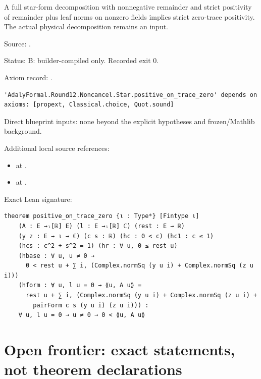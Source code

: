 \begin{theorem}[bp-340]
\label{bp-340}
\uses{}
\leanok
A full star-form decomposition with nonnegative remainder and strict positivity of remainder plus leaf norms on nonzero fields implies strict zero-trace positivity. The actual physical decomposition remains an input.

\par Source: \texttt{}.
\par Status: B: builder-compiled only. Recorded exit 0.
\par Axiom record: \texttt{}.
\begin{verbatim}
'AdalyFormal.Round12.Noncancel.Star.positive_on_trace_zero' depends on axioms: [propext, Classical.choice, Quot.sound]
\end{verbatim}
\par Direct blueprint inputs: none beyond the explicit hypotheses and frozen/Mathlib background.
\par Additional local source references:
\begin{itemize}
\item \texttt{} at \texttt{}.
\item \texttt{} at \texttt{}.
\end{itemize}
\par Exact Lean signature:
\begin{verbatim}
theorem positive_on_trace_zero {ι : Type*} [Fintype ι]
    (A : E →ₗ[ℝ] E) (l : E →ₗ[ℝ] ℂ) (rest : E → ℝ)
    (y z : E → ι → ℂ) (c s : ℝ) (hc : 0 < c) (hc1 : c ≤ 1)
    (hcs : c^2 + s^2 = 1) (hr : ∀ u, 0 ≤ rest u)
    (hbase : ∀ u, u ≠ 0 →
      0 < rest u + ∑ i, (Complex.normSq (y u i) + Complex.normSq (z u i)))
    (hform : ∀ u, l u = 0 → ⟪u, A u⟫ =
      rest u + ∑ i, (Complex.normSq (y u i) + Complex.normSq (z u i) +
        pairForm c s (y u i) (z u i))) :
    ∀ u, l u = 0 → u ≠ 0 → 0 < ⟪u, A u⟫
\end{verbatim}
\end{theorem}
\section{Open frontier: exact statements, not theorem declarations}

